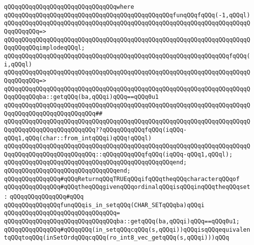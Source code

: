 \verb|qQQqqQQqqQQqqQQqqQQqqQQqqQQqqQQqwhere|\newline
\verb|qQQqqQQqqQQqqQQqqQQqqQQqqQQqqQQqqQQqqQQqqQQqqQQqfunqQQqfqQQq(-1,qQQql)|\newline
\verb|qQQqqQQqqQQqqQQqqQQqqQQqqQQqqQQqqQQqqQQqqQQqqQQqqQQqqQQqqQQqqQQqqQQqqQQqqQQqqQQq=>|\newline
\verb|qQQqqQQqqQQqqQQqqQQqqQQqqQQqqQQqqQQqqQQqqQQqqQQqqQQqqQQqqQQqqQQqqQQqqQQqqQQqqQQqimplodeqQQql;|\newline
\newline
\verb|qQQqqQQqqQQqqQQqqQQqqQQqqQQqqQQqqQQqqQQqqQQqqQQqqQQqqQQqqQQqqQQqfqQQq(i,qQQql)|\newline
\verb|qQQqqQQqqQQqqQQqqQQqqQQqqQQqqQQqqQQqqQQqqQQqqQQqqQQqqQQqqQQqqQQqqQQqqQQqqQQqqQQq=>|\newline
\verb|qQQqqQQqqQQqqQQqqQQqqQQqqQQqqQQqqQQqqQQqqQQqqQQqqQQqqQQqqQQqqQQqqQQqqQQqqQQqqQQqba::getqQQq(ba,qQQqi)qQQq==qQQq0u1|\newline
\verb|qQQqqQQqqQQqqQQqqQQqqQQqqQQqqQQqqQQqqQQqqQQqqQQqqQQqqQQqqQQqqQQqqQQqqQQqqQQqqQQqqQQqqQQqqQQqqQQq##|\newline
\verb|qQQqqQQqqQQqqQQqqQQqqQQqqQQqqQQqqQQqqQQqqQQqqQQqqQQqqQQqqQQqqQQqqQQqqQQqqQQqqQQqqQQqqQQqqQQqqQQq??qQQqqQQqqQQqfqQQq(iqQQq-qQQq1,qQQq(char::from_intqQQqi)qQQq!qQQql)|\newline
\verb|qQQqqQQqqQQqqQQqqQQqqQQqqQQqqQQqqQQqqQQqqQQqqQQqqQQqqQQqqQQqqQQqqQQqqQQqqQQqqQQqqQQqqQQqqQQqqQQq::qQQqqQQqqQQqfqQQq(iqQQq-qQQq1,qQQql);|\newline
\verb|qQQqqQQqqQQqqQQqqQQqqQQqqQQqqQQqqQQqqQQqqQQqqQQqend;|\newline
\verb|qQQqqQQqqQQqqQQqqQQqqQQqqQQqqQQqend;|\newline
\newline
\verb|qQQqqQQqqQQqqQQq#qQQqReturnqQQqTRUEqQQqifqQQqtheqQQqcharacterqQQqof|\newline
\verb|qQQqqQQqqQQqqQQq#qQQqtheqQQqgivenqQQqordinalqQQqisqQQqinqQQqtheqQQqset:|\newline
\verb|qQQqqQQqqQQqqQQq#qQQq|\newline
\verb|qQQqqQQqqQQqqQQqfunqQQqis_in_setqQQq(CHAR_SETqQQqba)qQQqi|\newline
\verb|qQQqqQQqqQQqqQQqqQQqqQQqqQQqqQQq=|\newline
\verb|qQQqqQQqqQQqqQQqqQQqqQQqqQQqqQQqba::getqQQq(ba,qQQqi)qQQq==qQQq0u1;|\newline
\newline
\verb|qQQqqQQqqQQqqQQq#qQQqqQQq(in_setqQQqcqQQq(s,qQQqi))qQQqisqQQqequivalentqQQqtoqQQq(inSetOrdqQQqcqQQq(ro_int8_vec_getqQQq(s,qQQqi)))qQQq|\newline
